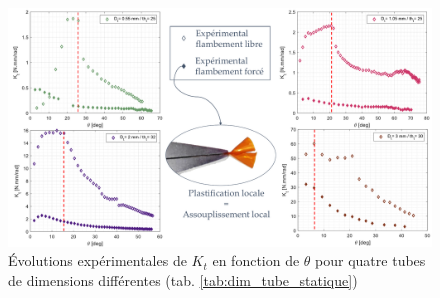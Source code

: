 \documentclass[3p,twocolumn,preprint]{elsarticle}
\begin{document}
\begin{figure}[!htb]
	\begin{center}
		\captionsetup{justification=centering}
		\includegraphics[trim={0cm 0cm 0cm 0cm},clip,width=\textwidth]{figures/resultats_essais_statique_VH_tous_sans_simu.pdf}
		\caption{Évolutions expérimentales de $K_t$ en fonction de $\theta$ pour quatre tubes de dimensions différentes (tab. \ref{tab:dim_tube_statique})}
		\label{fig:resultats_essais_statique_VH_tous}
	\end{center}
\end{figure} 
\end{document}
